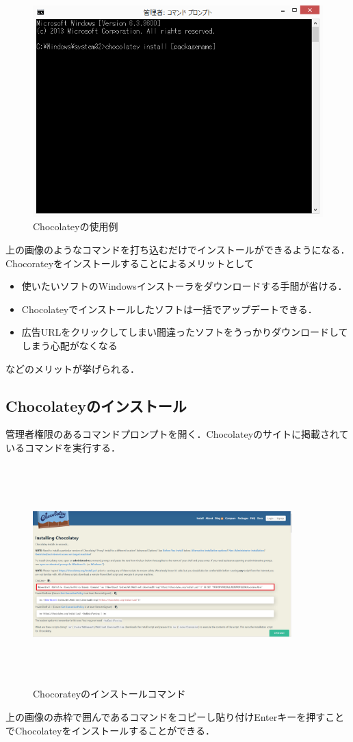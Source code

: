\begin{figure}[htb]
\centering
\includegraphics[width=12cm]{choco.PNG}
\caption{Chocolateyの使用例}\label{サンプル図}
\end{figure}


上の画像のようなコマンドを打ち込むだけでインストールができるようになる．Chocorateyをインストールすることによるメリットとして
\begin{itemize}
 \item 使いたいソフトのWindowsインストーラをダウンロードする手間が省ける．
 \item Chocolateyでインストールしたソフトは一括でアップデートできる．
 \item 広告URLをクリックしてしまい間違ったソフトをうっかりダウンロードしてしまう心配がなくなる
\end{itemize}
などのメリットが挙げられる．

\newpage

\subsection{Chocolateyのインストール}
管理者権限のあるコマンドプロンプトを開く．Chocolateyのサイトに掲載されているコマンドを実行する．

\begin{figure}[htb]
\centering
\includegraphics[height=8.5cm,width=10cm]{chocohomepage.PNG}
\caption{Chocorateyのインストールコマンド}\label{サンプル図}
\end{figure}
上の画像の赤枠で囲んであるコマンドをコピーし貼り付けEnterキーを押すことでChocolateyをインストールすることができる．

